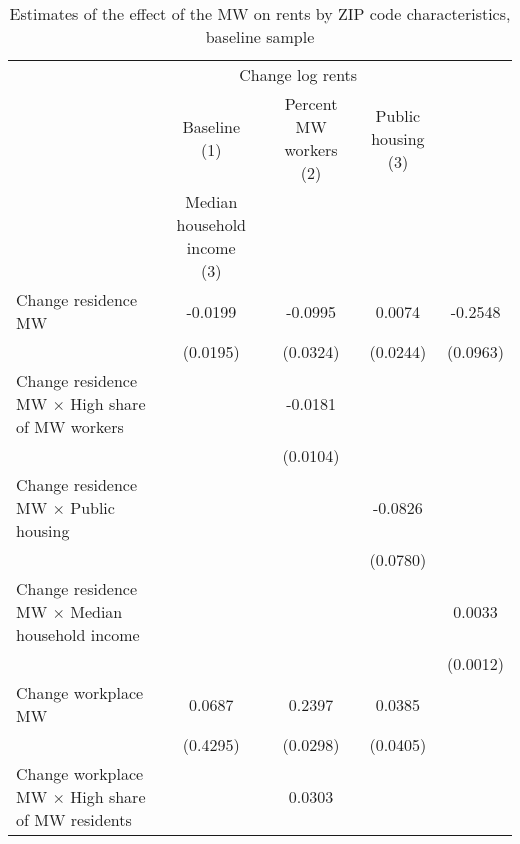 \begin{table}[hbt!] \centering
    \caption{Estimates of the effect of the MW on rents by ZIP code characteristics, baseline sample}
    \label{tab:heterogeneity}
    \begin{tabular}{@{}lcccc@{}}
        \toprule
            & \multicolumn{3}{c}{Change log rents}                                                  \\ \cmidrule(l){2-4} 
            & \shortstack{Baseline\\(1)} 
            & \shortstack{Percent MW workers\\(2)}                                             
            & \shortstack{Public housing\\(3)}                                                      \\
            & \shortstack{Median household income \\(3)}                             \\ \midrule
        Change residence MW                                     &  -0.0199   &  -0.0995  &  0.0074   &  -0.2548   \\
                                                                & (0.0195)  & (0.0324) & (0.0244)  & (0.0963)  \\
        Change residence MW $\times$ High share of MW workers   &        &  -0.0181  &        &        \\
                                                                &        & (0.0104) &        &        \\
        Change residence MW $\times$ Public housing             &        &       &  -0.0826   &        \\
                                                                &        &       & (0.0780)  &        \\
        Change residence MW $\times$ Median household income    &        &       &        &  0.0033   \\
                                                                &        &       &        & (0.0012)  \\
        Change workplace MW                                     &  0.0687   &  0.2397  &  0.0385   &        \\
                                                                & (0.4295)  & (0.0298) & (0.0405)  &        \\
        Change workplace MW $\times$ High share of MW residents &        &  0.0303  &        &        \\

\end{tabular}
\end{table}
